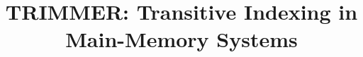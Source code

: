 \documentclass{acm_proc_article-sp}
\begin{document}
\title{TRIMMER: Transitive Indexing in Main-Memory Systems}



\maketitle



%
%
%
%
%





\end{document}
